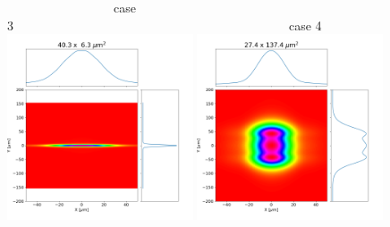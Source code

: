 \documentclass[]{article}
\begin{document}
\begin{figure}
    ~~~~~~~~~~~~~~~~~case 3~~~~~~~~~~~~~~~~~~~~~~~~~~~~~~~~~~~~~~~~~~~~case 4\\
    \includegraphics[width=0.49\textwidth]{figures/case3_srw.png}
    \includegraphics[width=0.49\textwidth]{figures/case4_srw.png}
\end{figure}

\end{document}
